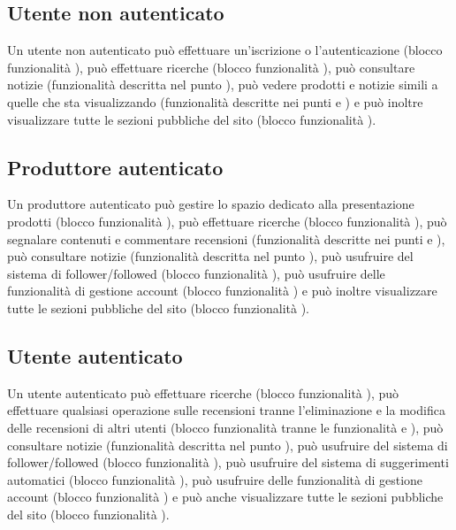 \subsection{Utente non autenticato}
Un utente non autenticato può effettuare un’iscrizione o l’autenticazione (blocco funzionalità ), può effettuare ricerche (blocco funzionalità ), può consultare notizie (funzionalità descritta nel punto ), può vedere prodotti e notizie simili a quelle che sta visualizzando (funzionalità descritte nei punti  e ) e può inoltre visualizzare tutte le sezioni pubbliche del sito (blocco funzionalità ).

\subsection{Produttore autenticato}
Un produttore autenticato può gestire lo spazio dedicato alla presentazione prodotti (blocco funzionalità ), può effettuare ricerche (blocco funzionalità ), può segnalare contenuti e commentare recensioni (funzionalità descritte nei punti  e ), può consultare notizie (funzionalità descritta nel punto ), può usufruire del sistema di follower/followed (blocco funzionalità ), può usufruire delle funzionalità di gestione account (blocco funzionalità ) e può inoltre visualizzare tutte le sezioni pubbliche del sito (blocco funzionalità ).

\subsection{Utente autenticato}
Un utente autenticato può effettuare ricerche (blocco funzionalità ), può effettuare qualsiasi operazione sulle recensioni tranne l’eliminazione e la modifica delle recensioni di altri utenti (blocco funzionalità  tranne le funzionalità  e ),  può consultare notizie (funzionalità descritta nel punto ), può usufruire del sistema di follower/followed  (blocco funzionalità ), può usufruire del sistema di suggerimenti automatici  (blocco funzionalità ), può usufruire delle funzionalità di gestione account (blocco funzionalità ) e può anche visualizzare tutte le sezioni pubbliche del sito  (blocco funzionalità ).

